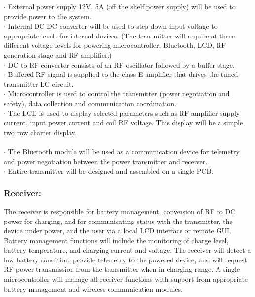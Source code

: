 \documentclass[12pt]{article}
\begin{document}
\noindent
$\cdot$ External power supply  12V, 5A (off the shelf power supply) will be used to provide power to the system.\\
$\cdot$ Internal DC-DC converter will be used to step down input voltage to appropriate levels for internal devices. (The transmitter will require at three different voltage levels for powering  microcontroller, Bluetooth, LCD, RF generation stage and RF amplifier.)  \\
$\cdot$ DC to RF converter consists of an RF oscillator followed by a buffer stage.\\%
$\cdot$ Buffered RF signal  is supplied  to the class E amplifier that drives the tuned transmitter LC circuit.\\ %
$\cdot$ Microcontroller is used to control the transmitter (power negotiation and safety), data collection and communication coordination.\\ %
$\cdot$ The LCD is used to display selected parameters such as RF amplifier supply current, input power current and coil RF voltage.  This display will be a simple two row charter display. \\
\hfill \\
$\cdot$ The Bluetooth module will be used as a communication device for telemetry and power negotiation between the power transmitter and receiver.\\
$\cdot$ Entire transmitter  will be designed and assembled on a single PCB.%


\subsubsection{Receiver:} 
The receiver is responsible for battery management, conversion of RF to DC power for charging, and for communicating status with the transmitter, the device under power, and the user via a local LCD interface or remote GUI. Battery management functions will include the monitoring of charge level, battery temperature, and charging current and voltage. The receiver will detect a low battery condition, provide telemetry to the powered device, and will request RF power transmission from the transmitter when in charging range. A single microcontroller will manage all receiver functions with support from appropriate battery management and wireless communication modules.
\end{document}

